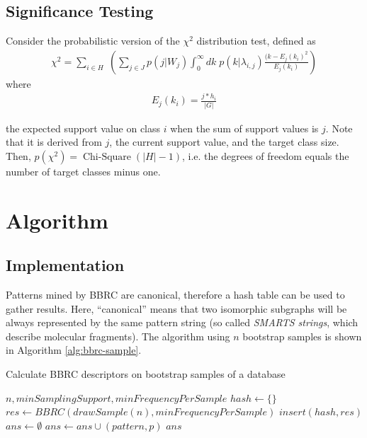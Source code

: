 \documentclass{article}
\begin{document}
\subsection{Significance Testing}
\label{ss:significanceTesting}
Consider the probabilistic version of the $\chi^2$ distribution test, defined as
\begin{align}
  \chi^2 = \sum_{i \in H}\; \left( \sum_{j \in J}p(j|W_j) \int_0^{\infty}dk\; p(k|\lambda_{i,j}) \frac{(k-E_j(k_i)^2}{E_j(k_i)} \right)
\end{align}
where 
\begin{align}
  E_j(k_i) = \frac{j * h_i}{\vert G\vert}
\end{align}

the expected support value on class $i$ when the sum of support values is $j$. Note that it is derived from $j$, the current support value, and the target class size. Then, $p(\chi^2)=\operatorname{Chi-Square}\left(\vert H\vert-1\right)$, i.e. the degrees of freedom equals the number of target classes minus one.

\section{Algorithm}

\subsection{Implementation}
Patterns mined by BBRC are canonical, therefore a hash table can be used to gather results. Here, ``canonical'' means that two isomorphic subgraphs will be always represented by the same pattern string (so called \emph{SMARTS strings}, which describe molecular fragments). The algorithm using $n$ bootstrap samples is shown in Algorithm \ref{alg:bbrc-sample}.
\renewcommand{\algorithmicrequire}{\textbf{Input:}}
\renewcommand{\algorithmicensure}{\textbf{Output:}}
\begin{algorithm}
  \caption{Calculate BBRC descriptors on bootstrap samples of a database}
  \label{alg:bbrc-sample}
\begin{algorithmic}[1]
  \Require $n, minSamplingSupport, minFrequencyPerSample$
  \State $hash \gets \{\}$
   
    \State $res \gets BBRC(drawSample(n), minFrequencyPerSample)$
    \State $insert(hash,res)$
  \EndFor
  \State $ans \gets \emptyset$
        \State $ans\gets ans \cup (pattern,p)$
      \EndIf
    \EndIf
  \EndFor
  \Ensure $ans$
\end{algorithmic}
\end{algorithm}
\end{document}
